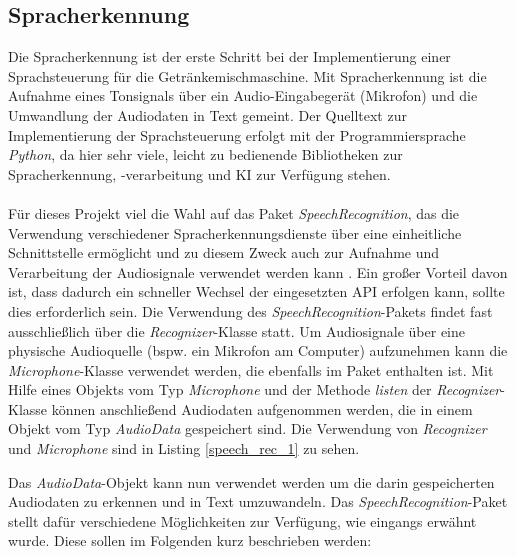 \subsection{Spracherkennung}\label{section:Spracherkennung}
Die Spracherkennung ist der erste Schritt bei der Implementierung einer Sprachsteuerung für die Getränkemischmaschine. Mit Spracherkennung ist die Aufnahme eines Tonsignals über ein Audio-Eingabegerät (Mikrofon) und die Umwandlung der Audiodaten in Text gemeint. Der Quelltext zur Implementierung der Sprachsteuerung erfolgt mit der Programmiersprache \textit{Python}, da hier sehr viele, leicht zu bedienende Bibliotheken zur Spracherkennung, -verarbeitung und \ac{KI} zur Verfügung stehen.\\\\
Für dieses Projekt viel die Wahl auf das Paket \textit{SpeechRecognition}, das die Verwendung verschiedener Spracherkennungsdienste über eine einheitliche Schnittstelle ermöglicht und zu diesem Zweck auch zur Aufnahme und Verarbeitung der Audiosignale verwendet werden kann \cite{speechrecognition}. Ein großer Vorteil davon ist, dass dadurch ein schneller Wechsel der eingesetzten \ac{API} erfolgen kann, sollte dies erforderlich sein. Die Verwendung des \textit{SpeechRecognition}-Pakets findet fast ausschließlich über die \textit{Recognizer}-Klasse statt. Um Audiosignale über eine physische Audioquelle (bspw. ein Mikrofon am Computer) aufzunehmen kann die \textit{Microphone}-Klasse verwendet werden, die ebenfalls im Paket enthalten ist. Mit Hilfe eines Objekts vom Typ \textit{Microphone} und der Methode \textit{listen} der \textit{Recognizer}-Klasse können anschließend Audiodaten aufgenommen werden, die in einem Objekt vom Typ \textit{AudioData} gespeichert sind. Die Verwendung von \textit{Recognizer} und \textit{Microphone} sind in Listing \ref{speech_rec_1} zu sehen. 

Das \textit{AudioData}-Objekt kann nun verwendet werden um die darin gespeicherten Audiodaten zu erkennen und in Text umzuwandeln. Das \textit{SpeechRecognition}-Paket stellt dafür verschiedene Möglichkeiten zur Verfügung, wie eingangs erwähnt wurde. Diese sollen im Folgenden kurz beschrieben werden:
